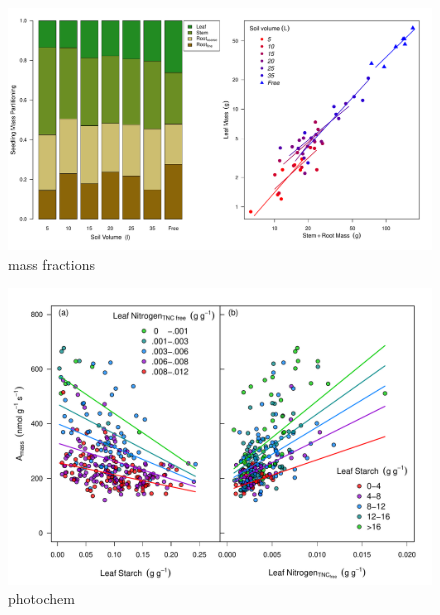 \documentclass[a4paper]{article}\usepackage[]{graphicx}\usepackage[]{color}
\begin{document}
\begin{figure}[h!]
    \centering
    \includegraphics{massfractions.pdf}
    \caption{mass fractions}
    \label{fig:figure4}
\end{figure}

\begin{figure}[h!]
    \centering
    \includegraphics{A_leafchem.pdf}
    \caption{photochem}
    \label{fig:figure5}
\end{figure}
\end{document}
